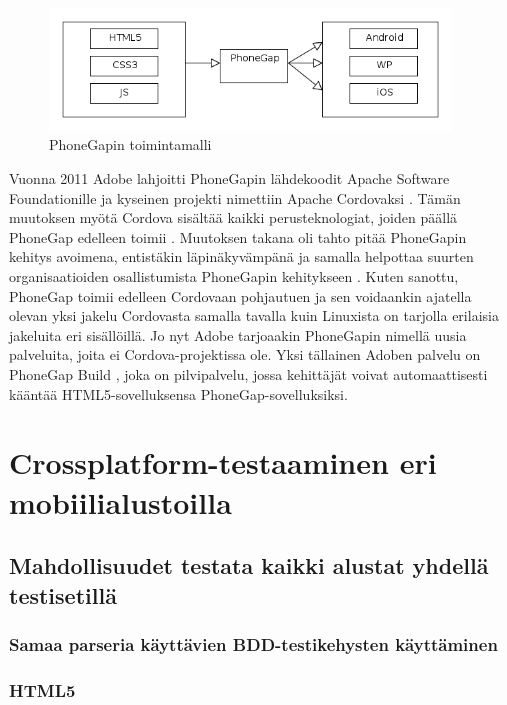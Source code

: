 \documentclass[finnish,nonumbib,nocopyright]{gradu2}
\begin{document}
\begin{figure}
\centering
\includegraphics[width=0.95\textwidth]{phonegap}
\caption{PhoneGapin toimintamalli \cite{phonegap}}
\end{figure}

Vuonna 2011 Adobe lahjoitti PhoneGapin lähdekoodit Apache Software Foundationille ja kyseinen projekti nimettiin Apache Cordovaksi \cite{cordova}. Tämän muutoksen myötä Cordova sisältää kaikki perusteknologiat, joiden päällä PhoneGap edelleen toimii \cite{cordovablog}. Muutoksen takana oli tahto pitää PhoneGapin kehitys avoimena, entistäkin läpinäkyvämpänä ja samalla helpottaa suurten organisaatioiden osallistumista PhoneGapin kehitykseen \cite{cordovablog}. Kuten sanottu, PhoneGap toimii edelleen Cordovaan pohjautuen ja sen voidaankin ajatella olevan yksi jakelu Cordovasta samalla tavalla kuin Linuxista on tarjolla erilaisia jakeluita eri sisällöillä. Jo nyt Adobe tarjoaakin PhoneGapin nimellä uusia palveluita, joita ei Cordova-projektissa ole. Yksi tällainen Adoben palvelu on PhoneGap Build \cite{phonegapbuild}, joka on pilvipalvelu, jossa kehittäjät voivat automaattisesti kääntää HTML5-sovelluksensa PhoneGap-sovelluksiksi. 

\chapter{Crossplatform-testaaminen eri mobiilialustoilla}
\label{chap:platforms}

\section{Mahdollisuudet testata kaikki alustat yhdellä testisetillä}

\subsection{Samaa parseria käyttävien BDD-testikehysten käyttäminen}

\subsection{HTML5}
\end{document}
